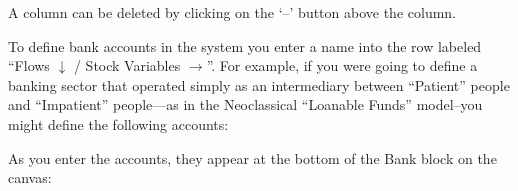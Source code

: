 \begin{center}
\end{center}


A column can be deleted by clicking on the `--' button above the column.

To define bank accounts in the system you enter a name into the row
labeled ``Flows $\downarrow$ / Stock Variables $\rightarrow$''. For example, if you were
going to define a banking sector that operated simply as an
intermediary between ``Patient'' people and ``Impatient'' people---as
in the Neoclassical ``Loanable Funds'' model--you might define the
following accounts: 


\begin{center}
\end{center}


As you enter the accounts, they appear at the bottom of the Bank block on the canvas:

